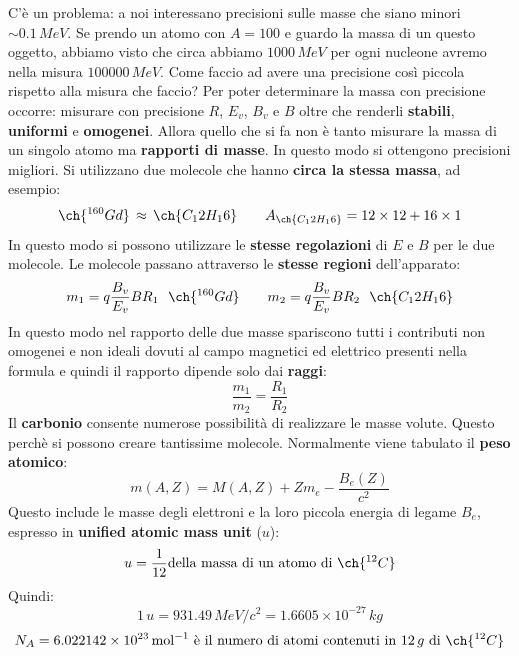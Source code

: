 C'è un problema: a noi interessano precisioni sulle masse che siano minori $\sim0.1\,MeV$. Se prendo un atomo con $A=100$ e guardo la massa di un questo oggetto, abbiamo visto che circa abbiamo $1000\,MeV$ per ogni nucleone avremo nella misura $100000\,MeV$. Come faccio ad avere una precisione così piccola rispetto alla misura che faccio? Per poter determinare la massa con precisione occorre: misurare con precisione $R$, $E_v$, $B_v$ e $B$ oltre che renderli \textbf{stabili}, \textbf{uniformi} e \textbf{omogenei}. Allora quello che si fa non è tanto misurare la massa di un singolo atomo ma \textbf{rapporti di masse}. In questo modo si ottengono precisioni migliori. Si utilizzano due molecole che hanno \textbf{circa la stessa massa}, ad esempio:
\begin{equation*}
    \ch{^{160}Gd} \,\approx \, \ch{C_12H_16} \qquad A_{\ch{C_12H_16}} =12\times12+16\times1
\end{equation*}
In questo modo si possono utilizzare le \textbf{stesse regolazioni} di $E$ e $B$ per le due molecole. Le molecole passano attraverso le \textbf{stesse regioni} dell'apparato:
\begin{equation*}
    m_1=q\frac{B_v}{E_v}BR_1 \, \,\,\,\ch{^{160}Gd} \qquad m_2=q\frac{B_v}{E_v}BR_2 \,\,\,\,\ch{C_12H_16}
\end{equation*}
In questo modo nel rapporto delle due masse spariscono tutti i contributi non omogenei e non ideali dovuti al campo magnetici ed elettrico presenti nella formula e quindi il rapporto dipende solo dai \textbf{raggi}:
\begin{equation*}
    \frac{m_1}{m_2}=\frac{R_1}{R_2}
\end{equation*}
Il \textbf{carbonio} consente numerose possibilità di realizzare le masse volute. Questo perchè si possono creare tantissime molecole. Normalmente viene tabulato il \textbf{peso atomico}:
\begin{equation*}
    m(A,Z)=M(A,Z)+Zm_e-\frac{B_e(Z)}{c^2}
\end{equation*}
Questo include le masse degli elettroni e la loro piccola energia di legame $B_e$, espresso in \textbf{unified atomic mass unit} ($u$):
\begin{equation*}
    u=\frac{1}{12} \text{della massa di un atomo di }\ch{^{12}C}
\end{equation*}
Quindi:
\begin{equation*}
    1\,u=931.49\,MeV/c^2=1.6605\times10^{-27}\,kg
\end{equation*}
\begin{equation*}
    N_A=6.022142\times10^{23}\,\text{mol}^{-1}\text{ è il numero di atomi contenuti in } 12\,g \text{ di } \ch{^{12}C}
\end{equation*}
